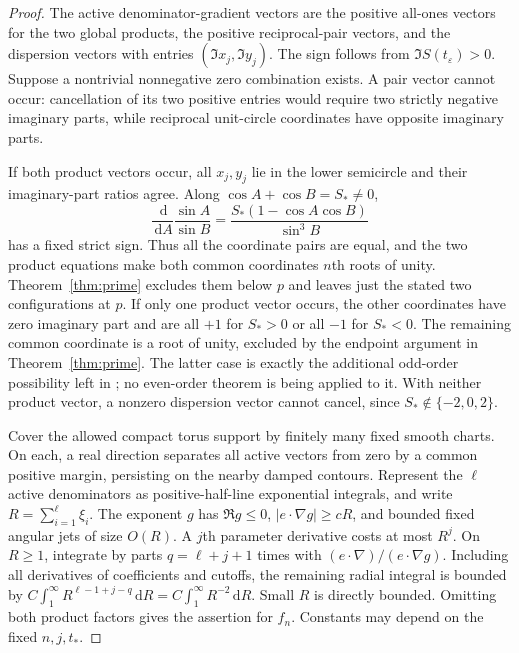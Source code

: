 \documentclass[11pt]{article}
\numberwithin{equation}{section}
\theoremstyle{definition}
\newcommand{\dd}{\,\mathrm d}
\newcommand{\eps}{\varepsilon}
\begin{document}
\begin{proof}
The active denominator-gradient vectors are the positive all-ones
vectors for the two global products, the positive reciprocal-pair
vectors, and the dispersion vectors with entries
$(\Im x_j,\Im y_j)$. The sign follows from $\Im S(t_\eps)>0$.
Suppose a nontrivial nonnegative zero combination exists. A pair
vector cannot occur: cancellation of its two positive entries would
require two strictly negative imaginary parts, while reciprocal
unit-circle coordinates have opposite imaginary parts.

If both product vectors occur, all $x_j,y_j$ lie in the lower
semicircle and their imaginary-part ratios agree. Along
$\cos A+\cos B=S_*\ne0$,
\[
 \frac{\dd}{\dd A}\frac{\sin A}{\sin B}
 =\frac{S_*(1-\cos A\cos B)}{\sin^3 B}
\]
has a fixed strict sign. Thus all the coordinate pairs are equal,
and the two product equations make both common coordinates $n$th
roots of unity. Theorem~\ref{thm:prime} excludes them below $p$
and leaves just the stated two configurations at $p$.
If only one product vector occurs, the other coordinates have zero
imaginary part and are all $+1$ for $S_*>0$ or all $-1$ for
$S_*<0$. The remaining common coordinate is a root of unity,
excluded by the endpoint argument in Theorem~\ref{thm:prime}.
The latter case is exactly the additional odd-order possibility
left in \cite[footnote~5]{TW2014}; no even-order theorem is being
applied to it. With neither product vector, a nonzero dispersion
vector cannot cancel, since $S_*\notin\{-2,0,2\}$.

Cover the allowed compact torus support by finitely many fixed
smooth charts. On each, a real direction separates all active
vectors from zero by a common positive margin, persisting on the
nearby damped contours. Represent the $\ell$ active denominators
as positive-half-line exponential integrals, and write
$R=\sum_{i=1}^{\ell}\xi_i$. The exponent $g$ has
$\Re g\le0$, $|e\cdot\nabla g|\ge cR$, and bounded fixed
angular jets of size $O(R)$. A $j$th parameter derivative costs
at most $R^j$. On $R\ge1$, integrate by parts
$q=\ell+j+1$ times with $(e\cdot\nabla)/(e\cdot\nabla g)$.
Including all derivatives of coefficients and cutoffs, the
remaining radial integral is bounded by
$C\int_1^\infty R^{\ell-1+j-q}\dd R=C\int_1^\infty R^{-2}\dd R$.
Small $R$ is directly bounded. Omitting both product factors gives
the assertion for $f_n$. Constants may depend on the fixed $n,j,t_*$.
\end{proof}
\end{document}

